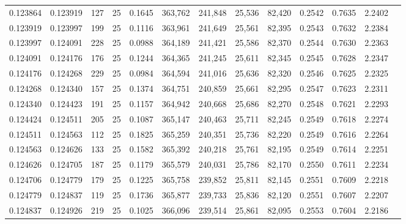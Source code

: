 \begin{tabular}{rrrrrrrrrrrrr}
0.123864 & 0.123919 &   127 &  25 &                                     0.1645 & 363,762 & 241,848 &  25,536 &  82,420 & 0.2542 & 0.7635 & 2.2402 \\
0.123919 & 0.123997 &   199 &  25 &                                     0.1116 & 363,961 & 241,649 &  25,561 &  82,395 & 0.2543 & 0.7632 & 2.2384 \\
0.123997 & 0.124091 &   228 &  25 &                                     0.0988 & 364,189 & 241,421 &  25,586 &  82,370 & 0.2544 & 0.7630 & 2.2363 \\
0.124091 & 0.124176 &   176 &  25 &                                     0.1244 & 364,365 & 241,245 &  25,611 &  82,345 & 0.2545 & 0.7628 & 2.2347 \\
0.124176 & 0.124268 &   229 &  25 &                                     0.0984 & 364,594 & 241,016 &  25,636 &  82,320 & 0.2546 & 0.7625 & 2.2325 \\
0.124268 & 0.124340 &   157 &  25 &                                     0.1374 & 364,751 & 240,859 &  25,661 &  82,295 & 0.2547 & 0.7623 & 2.2311 \\
0.124340 & 0.124423 &   191 &  25 &                                     0.1157 & 364,942 & 240,668 &  25,686 &  82,270 & 0.2548 & 0.7621 & 2.2293 \\
0.124424 & 0.124511 &   205 &  25 &                                     0.1087 & 365,147 & 240,463 &  25,711 &  82,245 & 0.2549 & 0.7618 & 2.2274 \\
0.124511 & 0.124563 &   112 &  25 &                                     0.1825 & 365,259 & 240,351 &  25,736 &  82,220 & 0.2549 & 0.7616 & 2.2264 \\
0.124563 & 0.124626 &   133 &  25 &                                     0.1582 & 365,392 & 240,218 &  25,761 &  82,195 & 0.2549 & 0.7614 & 2.2251 \\
0.124626 & 0.124705 &   187 &  25 &                                     0.1179 & 365,579 & 240,031 &  25,786 &  82,170 & 0.2550 & 0.7611 & 2.2234 \\
0.124706 & 0.124779 &   179 &  25 &                                     0.1225 & 365,758 & 239,852 &  25,811 &  82,145 & 0.2551 & 0.7609 & 2.2218 \\
0.124779 & 0.124837 &   119 &  25 &                                     0.1736 & 365,877 & 239,733 &  25,836 &  82,120 & 0.2551 & 0.7607 & 2.2207 \\
0.124837 & 0.124926 &   219 &  25 &                                     0.1025 & 366,096 & 239,514 &  25,861 &  82,095 & 0.2553 & 0.7604 & 2.2186 \\

\end{tabular}
